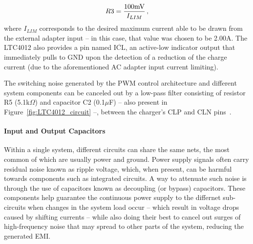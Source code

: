 \begin{equation}\label{eq:r_cl}
    R3=\frac{100\textrm{mV}}{I_{LIM}}\,,\medskip
\end{equation}
where $I_{LIM}$ corresponds to the desired maximum current able to be drawn from the external adapter input -- in this case, that value was chosen to be 2.00A. The LTC4012 also provides a pin named $\overline{\mbox{ICL}}$, an active-low indicator output that immediately pulls to GND upon the detection of a reduction of the charge current (due to the aforementioned AC adapter input current limiting).

The switching noise generated by the PWM control architecture and different system components can be canceled out by a low-pass filter consisting of resistor R5 (5.1k$\Omega$) and capacitor C2 (0.1$\mu$F) -- also present in Figure~\ref{fig:LTC4012_circuit} --, between the charger's CLP and CLN pins~\cite{LTC4012}.


\paragraph{Input and Output Capacitors}	Within a single system, different circuits can share the same nets, the most common of which are usually power and ground. Power supply signals often carry residual noise known as ripple voltage, which, when present, can be harmful towards components such as integrated circuits. A way to attenuate such noise is through the use of capacitors known as decoupling (or bypass) capacitors. These components help guarantee the continuous power supply to the differnet sub-circuits when changes in the system load occur -- which result in voltage drops caused by shifting currents -- while also doing their best to cancel out surges of high-frequency noise that may spread to other parts of the system, reducing the generated \gls{EMI}. 

